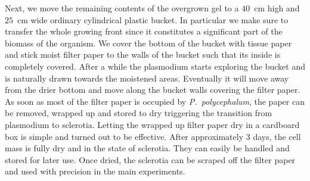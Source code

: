 	Next, we move the remaining contents of the overgrown gel to a $40$~cm high and $25$~cm wide ordinary cylindrical plastic bucket. In particular we make sure to transfer the whole growing front since it constitutes a significant part of the biomass of the organism. We cover the bottom of the bucket with tissue paper and stick moist filter paper to the walls of the bucket such that its inside is completely covered. After a while the plasmodium starts exploring the bucket and is naturally drawn towards the moistened areas. Eventually it will move away from the drier bottom and move along the bucket walls covering the filter paper. As soon as most of the filter paper is occupied by \emph{P.~polycephalum}, the paper can be removed, wrapped up and stored to dry triggering the transition from plasmodium to sclerotia. Letting the wrapped up filter paper dry in a cardboard box is simple and turned out to be effective. After approximately $3$ days, the cell mass is fully dry and in the state of sclerotia. They can easily be handled and stored for later use. Once dried, the sclerotia can be scraped off the filter paper and used with precision in the main experiments.

